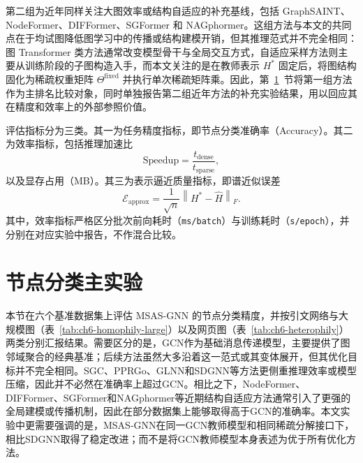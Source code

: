第二组为近年同样关注大图效率或结构自适应的补充基线，包括 GraphSAINT\cite{Zeng2020GraphSAINT}、NodeFormer\cite{Wu2022NodeFormer}、DIFFormer\cite{Wu2023DIFFormer}、SGFormer\cite{Wu2023SGFormer} 和 NAGphormer\cite{Chen2023NAGphormer}。这组方法与本文的共同点在于均试图降低图学习中的传播或结构建模开销，但其推理范式并不完全相同：图 Transformer 类方法通常改变模型骨干与全局交互方式，自适应采样方法则主要从训练阶段的子图构造入手，而本文关注的是在教师表示 $H^*$ 固定后，将图结构固化为稀疏权重矩阵 $\Theta^{\mathrm{fixed}}$ 并执行单次稀疏矩阵乘。因此，第~\ref{sec:ch6-main}~节将第一组方法作为主排名比较对象，同时单独报告第二组近年方法的补充实验结果，用以回应其在精度和效率上的外部参照价值。

评估指标分为三类。其一为任务精度指标，即节点分类准确率（Accuracy）。其二为效率指标，包括推理加速比
\begin{equation}
\mathrm{Speedup}=\frac{t_{\mathrm{dense}}}{t_{\mathrm{sparse}}},
\label{eq:ch6-speedup}
\end{equation}
以及显存占用（MB）。其三为表示逼近质量指标，即谱近似误差
\begin{equation}
\mathcal{E}_{\mathrm{approx}}=\frac{1}{\sqrt{n}}\left\|H^*-\hat{H}\right\|_{F}.
\label{eq:ch6-approx}
\end{equation}
其中，效率指标严格区分批次前向耗时（\texttt{ms/batch}）与训练耗时（\texttt{s/epoch}），并分别在对应实验中报告，不作混合比较。

\section{节点分类主实验}
\label{sec:ch6-main}

本节在六个基准数据集上评估 MSAS-GNN 的节点分类精度，并按引文网络与大规模图（表~\ref{tab:ch6-homophily-large}）以及网页图（表~\ref{tab:ch6-heterophily}）两类分别汇报结果。需要区分的是，GCN作为基础消息传递模型，主要提供了图邻域聚合的经典基准；后续方法虽然大多沿着这一范式或其变体展开，但其优化目标并不完全相同。SGC、PPRGo、GLNN和SDGNN等方法更侧重推理效率或模型压缩，因此并不必然在准确率上超过GCN。相比之下，NodeFormer、DIFFormer、SGFormer和NAGphormer等近期结构自适应方法通常引入了更强的全局建模或传播机制，因此在部分数据集上能够取得高于GCN的准确率。本文实验中更需要强调的是，MSAS-GNN在同一GCN教师模型和相同稀疏分解接口下，相比SDGNN取得了稳定改进；而不是将GCN教师模型本身表述为优于所有优化方法。

